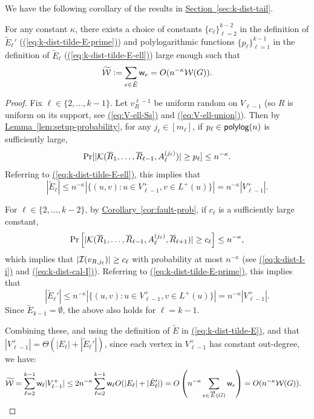 \documentclass{theoretics}
\newcommand{\eq}[1]{\hyperref[eq:#1]{(\ref*{eq:#1})}}
\renewcommand{\sec}[1]{\hyperref[sec:#1]{Section~\ref*{sec:#1}}}
\newcommand{\lem}[1]{\hyperref[lem:#1]{Lemma~\ref*{lem:#1}}}
\newcommand{\cor}[1]{\hyperref[cor:#1]{Corollary~\ref*{cor:#1}}}
\renewcommand{\>}{\rangle}
\newcommand{\<}{\langle}
\renewcommand{\(}{\left(}
\renewcommand{\)}{\right)}
\def\w{{\sf w}}
\begin{document}
\noindent We have the following corollary of the results in \sec{k-dist-tail}.
\begin{corollary}\label{cor:ktilde-E}
	For any constant $\kappa$, there exists a choice of constants $\{c_{\ell}\}_{\ell=2}^{k-2}$ in the definition of $\tilde{E}_{\ell}'$ (\eq{k-dist-tilde-E-prime}) and polylogarithmic functions $\{p_{\ell}\}_{\ell=1}^{k-1}$ in the definition of $\tilde{E}_{\ell}$ (\eq{k-dist-tilde-E-ell}) large enough such that 
	$$\widetilde{\cal W} := \sum_{e\in \tilde{E}}\w_e = O(n^{-\kappa}{\cal W}(G)).$$ 
\end{corollary}
\begin{proof}
Fix $\ell\in\{2,\dots,k-1\}$.
Let $v_R^{\ell-1}$ be uniform random on $V_{\ell-1}$ (so $R$ is uniform on its support, see \eq{V-ell-Ss} and \eq{V-ell-union}). Then by \lem{setup-probability}, for any $j_{\ell}\in [m_{\ell}]$, if $p_{\ell}\in{\sf polylog}(n)$ is sufficiently large, 
\begin{equation}
\Pr[|{\cal K}(\overline{R}_1,\dots,\overline{R}_{\ell-1},A_{\ell}^{(j_{\ell})})|\geq p_{\ell}]\leq n^{-\kappa}.\label{eq:k-dist-pl}
\end{equation}
Referring to \eq{k-dist-tilde-E-ell}, this implies that 
$$|\tilde{E}_{\ell}|\leq n^{-\kappa}|\{(u,v):u\in V_{\ell-1}^+, v\in L^+(u)\}|=n^{-\kappa}|V_{\ell-1}^+|.$$

For $\ell\in\{2,\dots,k-2\}$, by \cor{fault-prob}, if $c_{\ell}$ is a sufficiently large constant,  
$$\Pr\left[|{\cal K}(\overline{R}_1,\dots,\overline{R}_{\ell-1},A_{\ell}^{(j_{\ell})},\overline{R}_{\ell+1})| \geq c_{\ell} \right]\leq n^{-\kappa},$$
which implies that $|{\cal I}(v_{R,j_{\ell}})|\geq c_{\ell}$ with probability at most $n^{-\kappa}$ (see \eq{k-dist-I-i} and \eq{k-dist-cal-I}). 
Referring to \eq{k-dist-tilde-E-prime}, this implies that
$$|\tilde{E}_{\ell}'|\leq n^{-\kappa}|\{(u,v):u\in V_{\ell-1}^+, v\in L^+(u)\}|=n^{-\kappa}|V_{\ell-1}^+|.$$
Since $\tilde{E}_{k-1}=\emptyset$, the above also holds for $\ell=k-1$.

Combining these, and using
the definition of $\tilde{E}$ in \eq{k-dist-tilde-E},
and that $|V_{\ell-1}^+|=\Theta(|E_{\ell}|+|\tilde{E}_{\ell}'|)$, since each vertex in $V_{\ell-1}^+$ has constant out-degree,
we have:
\begin{align*}
\widetilde{\cal W} &= \sum_{\ell=2}^{k-1}\w_{\ell}|V_{\ell-1}^+|
\leq 2n^{-\kappa}\sum_{\ell=2}^{k-1}\w_{\ell}O(|E_{\ell}|+|\tilde{E}_{\ell}'|) 
=O\left(n^{-\kappa}\sum_{e\in\overrightarrow{E}(G)}\w_{e}\right)
= O(n^{-\kappa}{\cal W}(G)).\qedhere
\end{align*}
\end{proof}
\end{document}
